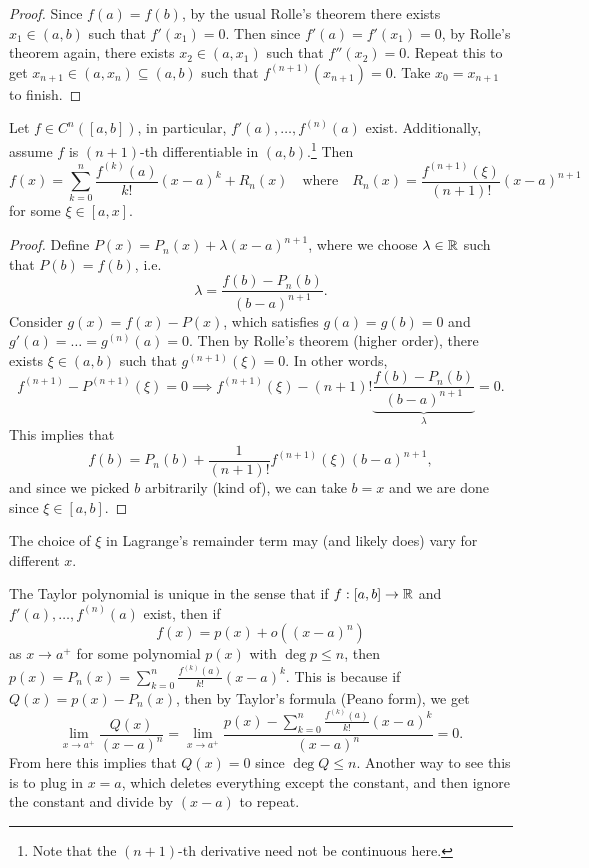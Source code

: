 \begin{proof}
  Since $f(a) = f(b)$, by the usual Rolle's theorem
  there exists $x_1 \in (a, b)$ such that $f'(x_1) = 0$.
  Then since $f'(a) = f'(x_1) = 0$, by
  Rolle's theorem again,
  there exists $x_2 \in (a, x_1)$ such that $f''(x_2) = 0$.
  Repeat this to get $x_{n + 1} \in (a, x_n) \subseteq (a, b)$ such that
  $f^{(n + 1)}(x_{n + 1}) = 0$. Take $x_0 = x_{n + 1}$
  to finish.
\end{proof}

\begin{theorem}
  Let $f \in C^n([a, b])$, in particular,
  $f'(a), \dots, f^{(n)}(a)$ exist. Additionally,
  assume $f$ is $(n + 1)$-th differentiable in $(a, b)$.\footnote{Note that the $(n + 1)$-th derivative need not be continuous here.}
  Then
  \[
    f(x) = \sum_{k = 0}^n \frac{f^{(k)}(a)}{k!}(x - a)^k + R_n(x) \quad \text{where} \quad R_n(x) = \frac{f^{(n + 1)}(\xi)}{(n + 1)!}(x - a)^{n + 1}
  \]
  for some $\xi \in [a, x]$.
\end{theorem}

\begin{proof}
  Define $P(x) = P_n(x) + \lambda (x - a)^{n + 1}$, where
  we choose $\lambda \in \mathbb{R}$ such that $P(b) = f(b)$, i.e.
  \[
    \lambda = \frac{f(b) - P_n(b)}{(b - a)^{n + 1}}.
  \]
  Consider $g(x)  = f(x) - P(x)$, which satisfies
  $g(a) = g(b) = 0$ and $g'(a) = \dots = g^{(n)}(a) = 0$.
  Then by Rolle's theorem (higher order), there exists
  $\xi \in (a, b)$ such that $g^{(n + 1)}(\xi) = 0$.
  In other words,
  \[
    f^{(n + 1)} - P^{(n + 1)}(\xi) = 0
    \implies f^{(n + 1)}(\xi) - (n + 1)! \underbrace{\frac{f(b) - P_n(b)}{(b - a)^{n + 1}}}_{\lambda} = 0.
  \]
  This implies that
  \[
    f(b) = P_n(b) + \frac{1}{(n + 1)!} f^{(n + 1)}(\xi) (b - a)^{n + 1},
  \]
  and since we picked $b$ arbitrarily (kind of),
  we can take $b = x$ and we are done since
  $\xi \in [a, b]$.
\end{proof}

\begin{remark}
  The choice of $\xi$ in Lagrange's remainder term
  may (and likely does) vary for different $x$.
\end{remark}

\begin{remark}
  The Taylor polynomial is unique in the sense that
  if $f : [a, b] \to \mathbb{R}$ and $f'(a), \dots, f^{(n)}(a)$
  exist, then if
  \[f(x) = p(x) + o((x - a)^n)\]
  as $x \to a^+$ for some polynomial $p(x)$ with
  $\deg p \le n$, then
  $p(x) = P_n(x) = \sum_{k = 0}^n \frac{f^{(k)}(a)}{k!} (x - a)^k$.
  This is because if $Q(x) = p(x) - P_n(x)$, then
  by Taylor's formula (Peano form), we get
  \[
    \lim_{x \to a^+} \frac{Q(x)}{(x - a)^n}
    = \lim_{x \to a^+} \frac{p(x) - \sum_{k = 0}^n \frac{f^{(k)}(a)}{k!} (x - a)^k}{(x - a)^n} = 0.
  \]
  From here this implies that $Q(x) = 0$ since $\deg Q \le n$.
  Another way to see this is to plug in $x = a$, which
  deletes
  everything except the constant, and then ignore the
  constant and divide
  by $(x - a)$ to repeat.
\end{remark}
